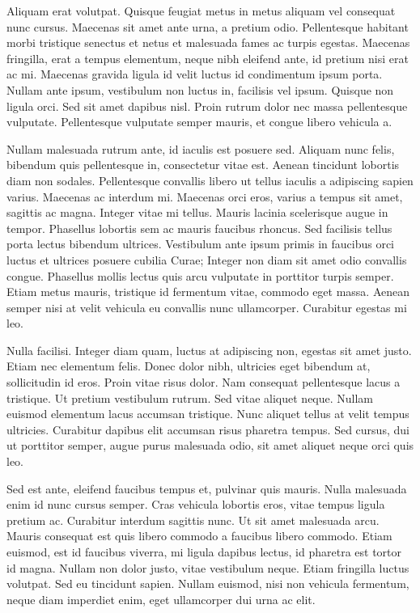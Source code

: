 \documentclass[a4paper]{article}
\begin{document}
Aliquam erat volutpat. Quisque feugiat metus in metus aliquam vel consequat nunc cursus. Maecenas sit amet ante urna, a pretium odio. Pellentesque habitant morbi tristique senectus et netus et malesuada fames ac turpis egestas. Maecenas fringilla, erat a tempus elementum, neque nibh eleifend ante, id pretium nisi erat ac mi. Maecenas gravida ligula id velit luctus id condimentum ipsum porta. Nullam ante ipsum, vestibulum non luctus in, facilisis vel ipsum. Quisque non ligula orci. Sed sit amet dapibus nisl. Proin rutrum dolor nec massa pellentesque vulputate. Pellentesque vulputate semper mauris, et congue libero vehicula a.

Nullam malesuada rutrum ante, id iaculis est posuere sed. Aliquam nunc felis, bibendum quis pellentesque in, consectetur vitae est. Aenean tincidunt lobortis diam non sodales. Pellentesque convallis libero ut tellus iaculis a adipiscing sapien varius. Maecenas ac interdum mi. Maecenas orci eros, varius a tempus sit amet, sagittis ac magna. Integer vitae mi tellus. Mauris lacinia scelerisque augue in tempor. Phasellus lobortis sem ac mauris faucibus rhoncus. Sed facilisis tellus porta lectus bibendum ultrices. Vestibulum ante ipsum primis in faucibus orci luctus et ultrices posuere cubilia Curae; Integer non diam sit amet odio convallis congue. Phasellus mollis lectus quis arcu vulputate in porttitor turpis semper. Etiam metus mauris, tristique id fermentum vitae, commodo eget massa. Aenean semper nisi at velit vehicula eu convallis nunc ullamcorper. Curabitur egestas mi leo.

Nulla facilisi. Integer diam quam, luctus at adipiscing non, egestas sit amet justo. Etiam nec elementum felis. Donec dolor nibh, ultricies eget bibendum at, sollicitudin id eros. Proin vitae risus dolor. Nam consequat pellentesque lacus a tristique. Ut pretium vestibulum rutrum. Sed vitae aliquet neque. Nullam euismod elementum lacus accumsan tristique. Nunc aliquet tellus at velit tempus ultricies. Curabitur dapibus elit accumsan risus pharetra tempus. Sed cursus, dui ut porttitor semper, augue purus malesuada odio, sit amet aliquet neque orci quis leo.

Sed est ante, eleifend faucibus tempus et, pulvinar quis mauris. Nulla malesuada enim id nunc cursus semper. Cras vehicula lobortis eros, vitae tempus ligula pretium ac. Curabitur interdum sagittis nunc. Ut sit amet malesuada arcu. Mauris consequat est quis libero commodo a faucibus libero commodo. Etiam euismod, est id faucibus viverra, mi ligula dapibus lectus, id pharetra est tortor id magna. Nullam non dolor justo, vitae vestibulum neque. Etiam fringilla luctus volutpat. Sed eu tincidunt sapien. Nullam euismod, nisi non vehicula fermentum, neque diam imperdiet enim, eget ullamcorper dui urna ac elit.
\end{document}
